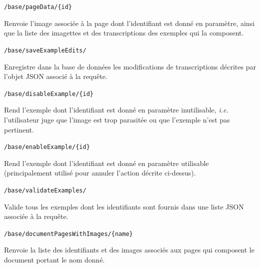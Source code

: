 \begin{description}[align=left]
\item [GET] \texttt{/base/pageData/\{id\}}\newline{}
\begin{itshape}
Renvoie l'image associée à la page dont l'identifiant est donné en paramètre, ainsi que la liste des imagettes et des transcriptions des exemples qui la composent.
\end{itshape}

\item [POST] \texttt{/base/saveExampleEdits/}\newline{}
\begin{itshape}
Enregistre dans la base de données les modifications de transcriptions décrites par l'objet JSON associé à la requête.
\end{itshape}

\item [PUT] \texttt{/base/disableExample/\{id\}}\newline{}
\begin{itshape}
Rend l'exemple dont l'identifiant est donné en paramètre inutilisable, \textit{i.e.} l'utilisateur juge que l'image est trop parasitée ou que l'exemple n'est pas pertinent.
\end{itshape}

\item [PUT] \texttt{/base/enableExample/\{id\}}\newline{}
\begin{itshape}
Rend l'exemple dont l'identifiant est donné en paramètre utilisable (principalement utilisé pour annuler l'action décrite ci-dessus).
\end{itshape}

\item [POST] \texttt{/base/validateExamples/}\newline{}
\begin{itshape}
Valide tous les exemples dont les identifiants sont fournis dans une liste JSON associée à la requête.
\end{itshape}

\item [Découpe]

\item [GET] \texttt{/base/documentPagesWithImages/\{name\}}\newline{}
\begin{itshape}
Renvoie la liste des identifiants et des images associés aux pages qui composent le document portant le nom donné.
\end{itshape}


\end{description}
